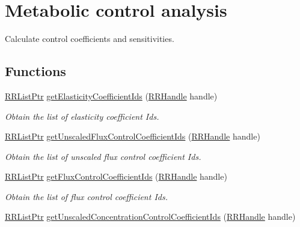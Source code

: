 \hypertarget{group__mca}{\section{Metabolic control analysis}
\label{group__mca}
}


Calculate control coefficients and sensitivities.  


\subsection*{Functions}
\begin{DoxyCompactItemize}
\item 
\hyperlink{rrc__types_8h_a32a8a60ac06858ff3a791672bd2bec73}{R\+R\+List\+Ptr} \hyperlink{group__mca_gacad76b5762c25a32e413b99e9b2cfb10}{get\+Elasticity\+Coefficient\+Ids} (\hyperlink{rrc__types_8h_a1d68f0592372208fa5a5f2799ea4b3ae}{R\+R\+Handle} handle)
\begin{DoxyCompactList}\small\item\em Obtain the list of elasticity coefficient Ids. \end{DoxyCompactList}\item 
\hyperlink{rrc__types_8h_a32a8a60ac06858ff3a791672bd2bec73}{R\+R\+List\+Ptr} \hyperlink{group__mca_ga90f444f3a93b225edda7264df6dbdb12}{get\+Unscaled\+Flux\+Control\+Coefficient\+Ids} (\hyperlink{rrc__types_8h_a1d68f0592372208fa5a5f2799ea4b3ae}{R\+R\+Handle} handle)
\begin{DoxyCompactList}\small\item\em Obtain the list of unscaled flux control coefficient Ids. \end{DoxyCompactList}\item 
\hyperlink{rrc__types_8h_a32a8a60ac06858ff3a791672bd2bec73}{R\+R\+List\+Ptr} \hyperlink{group__mca_ga9c427f19db0adbed6fd5642aa2f921ba}{get\+Flux\+Control\+Coefficient\+Ids} (\hyperlink{rrc__types_8h_a1d68f0592372208fa5a5f2799ea4b3ae}{R\+R\+Handle} handle)
\begin{DoxyCompactList}\small\item\em Obtain the list of flux control coefficient Ids. \end{DoxyCompactList}\item 
\hyperlink{rrc__types_8h_a32a8a60ac06858ff3a791672bd2bec73}{R\+R\+List\+Ptr} \hyperlink{group__mca_ga5eafcd38aa64319b3952f3379118a460}{get\+Unscaled\+Concentration\+Control\+Coefficient\+Ids} (\hyperlink{rrc__types_8h_a1d68f0592372208fa5a5f2799ea4b3ae}{R\+R\+Handle} handle)

\end{DoxyCompactItemize}
